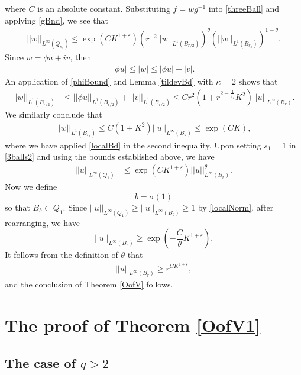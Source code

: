 \documentclass[12pt,reqno]{amsart}
\theoremstyle{plain}
\theoremstyle{definition}
\newcommand{\eps}{\varepsilon}
\newcommand{\te}{\theta}
\newcommand{\si}{\sigma}
\newcommand{\iny}{\infty}
\newcommand{\su}{\subset}
\newcommand{\norm}[1]{\left\vert \left\vert #1\right\vert\right\vert}
\newcommand{\abs}[1]{\left\vert#1\right\vert}
\newcommand{\pr}[1]{\left( #1 \right) }
\begin{document}
where $C$ is an absolute constant.
Substituting $f = w g^{-1}$ into \eqref{threeBall} and applying \eqref{gBnd}, we see that
\begin{align}
\norm{ w}_{L^\iny\pr{Q_{s_1}}} \le \exp\pr{C K^{1 + \eps}} \pr{r^{-2}\norm{w}_{L^1\pr{B_{r/2}}}}^\te \pr{\norm{ w}_{L^1\pr{B_{r_3}}}}^{1 - \te}.
\label{3balls2}
\end{align}
Since $w = \phi u+ i v$, then
\begin{align*}
\abs{\phi u} \le \abs{w} \le \abs{\phi u} +\abs{v}.
\end{align*}
An application of \eqref{phiBound} and Lemma \ref{tildevBd} with $\kappa = 2$ shows that
\begin{align*}
\norm{w}_{L^1\pr{B_{r/2}}}
&\le \norm{\phi u}_{L^1\pr{B_{r/2}}} + \norm{v}_{L^1\pr{B_{r/2}}}
\le C r^2 \pr{1 + r^{2 - \frac {4}{q_1} }K^2 } \norm{u}_{L^\iny\pr{B_{r}}}.
\end{align*}
We similarly conclude that
\begin{align*}
\norm{w}_{L^1\pr{B_{r_3}}}
\le C \pr{1 + K^2 } \norm{u}_{L^\iny\pr{B_{d}}}
\le \exp\pr{C K},
\end{align*}
where we have applied \eqref{localBd} in the second inequality.
Upon setting $s_1 = 1$ in \eqref{3balls2} and using the bounds established above, we have
\begin{align*}
\norm{u}_{L^\iny\pr{Q_{1}}} 
&\le \exp\pr{C K^{1 + \eps}} \norm{ u}_{L^\iny\pr{B_{r}}}^\te .
\end{align*}
Now we define 
\begin{equation}
\label{bsigma}
b = \si\pr{1}
\end{equation}
so that $B_b \su Q_1$.
Since $\norm{u}_{L^\iny\pr{Q_1}} \ge \norm{u}_{L^\iny\pr{B_b}} \ge 1$ by \eqref{localNorm}, after rearranging, we have
\begin{equation*}
\norm{ u}_{L^\iny\pr{B_r}} \ge \exp\pr{-\frac C \te K^{1 + \eps}}.
\end{equation*}
It follows from the definition of $\te$ that
\begin{align*}
\norm{ u}_{L^\iny\pr{B_{r}}} \ge r^{C K^{1 + \eps}},
\end{align*}
and the conclusion of Theorem \ref{OofV} follows.

\section{The proof of Theorem \ref{OofV1}}
\label{S6}

\subsection{The case of $q > 2$}
\end{document}
